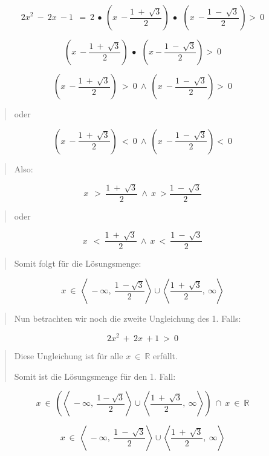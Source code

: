 \documentclass{book}
\begin{document}
\begin{longtable}[]
\begin{minipage}[b]{\linewidth}
\[{2x}^{2}\  - \ 2x\  - 1\ \  = \ 2\  \bullet \ (x\  - \frac{1\  + \ \sqrt{3}}{2})\  \bullet \ \ (x\  - \frac{1\  - \ \sqrt{3}}{2}) > \ 0\]

\[(x\  - \frac{1\  + \ \sqrt{3}}{2})\  \bullet \ \ (x - \frac{1\  - \ \sqrt{3}}{2}) > \ 0\]

\[(x\  - \frac{1\  + \ \sqrt{3}}{2})\  > \ 0\  \land \ (x\  - \frac{1\  - \ \sqrt{3}}{2}) > \ 0\]

\begin{quote}
oder
\end{quote}

\[(x\  - \frac{1\  + \ \sqrt{3}}{2})\  < \ 0\  \land \ (x\  - \frac{1\  - \ \sqrt{3}}{2}) < \ 0\]

\begin{quote}
Also:
\end{quote}

\[x\ \  > \ \frac{1\  + \ \sqrt{3}}{2}\  \land \ x\  > \frac{1\  - \ \sqrt{3}}{2}\]

\begin{quote}
oder
\end{quote}

\[x\ \  < \ \frac{1\  + \ \sqrt{3}}{2}\  \land \ x\  < \ \frac{1\  - \ \sqrt{3}}{2}\]

\begin{quote}
Somit folgt für die Lösungsmenge:
\end{quote}

\[x\  \in \ \left\langle \  - \infty,\ \frac{1\  - \sqrt{3}}{2} \right\rangle \cup \left\langle \frac{1\  + \ \sqrt{3}}{2},\ \infty \right\rangle\]

\begin{quote}
Nun betrachten wir noch die zweite Ungleichung des 1. Falls:
\end{quote}

\[{2x}^{2}\  + \ 2x\  + 1\  > \ 0\]

\begin{quote}
Diese Ungleichung ist für alle \(x\mathbb{\  \in \ R}\) erfüllt.

Somit ist die Lösungsmenge für den 1. Fall:
\end{quote}

\[x\  \in \ (\left\langle \  - \infty,\ \frac{1 - \sqrt{3}}{2} \right\rangle \cup \left\langle \frac{1\  + \ \sqrt{3}}{2},\ \infty \right\rangle)\  \cap \ x\mathbb{\  \in \ R}\]

\[x\  \in \ \left\langle \  - \infty,\ \frac{1\  - \ \sqrt{3}}{2} \right\rangle \cup \left\langle \frac{1\  + \ \sqrt{3}}{2},\ \infty \right\rangle\]


\end{minipage}
\end{longtable}
\end{document}
